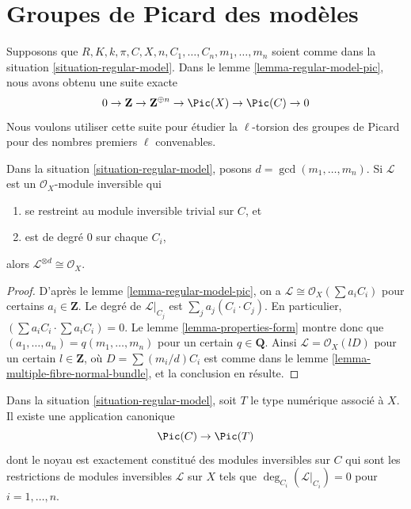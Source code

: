 




\section{Groupes de Picard des modèles}
\label{section-picard-groups-models}

\noindent
Supposons que $R,K,k,\pi,C,X,n,C_1,\ldots,C_n,m_1,\ldots,m_n$ soient comme
dans la situation \ref{situation-regular-model}. Dans le lemme
\ref{lemma-regular-model-pic}, nous avons obtenu une suite exacte
$$
0 \to \mathbf{Z} \to \mathbf{Z}^{\oplus n} \to
\Pic(X) \to \Pic(C) \to 0
$$
Nous voulons utiliser cette suite pour étudier la $\ell$-torsion des
groupes de Picard pour des nombres premiers $\ell$ convenables.

\begin{lemma}
\label{lemma-characterize-trivial}
Dans la situation \ref{situation-regular-model}, posons
$d=\gcd(m_1,\ldots,m_n)$. Si $\mathcal{L}$ est un
$\mathcal{O}_X$-module inversible qui
\begin{enumerate}
\item se restreint au module inversible trivial sur $C$, et
\item est de degré $0$ sur chaque $C_i$,
\end{enumerate}
alors $\mathcal{L}^{\otimes d} \cong \mathcal{O}_X$.
\end{lemma}

\begin{proof}
D'après le lemme \ref{lemma-regular-model-pic}, on a
$\mathcal{L} \cong \mathcal{O}_X(\sum a_iC_i)$ pour certains
$a_i \in \mathbf{Z}$. Le degré de $\mathcal{L}|_{C_j}$ est
$\sum_j a_j(C_i \cdot C_j)$. En particulier,
$(\sum a_iC_i \cdot \sum a_iC_i)=0$. Le lemme
\ref{lemma-properties-form} montre donc que
$(a_1,\ldots,a_n)=q(m_1,\ldots,m_n)$ pour un certain $q\in\mathbf{Q}$.
Ainsi $\mathcal{L}=\mathcal{O}_X(lD)$ pour un certain
$l\in\mathbf{Z}$, où $D=\sum(m_i/d)C_i$ est comme dans le lemme
\ref{lemma-multiple-fibre-normal-bundle}, et la conclusion en résulte.
\end{proof}

\begin{lemma}
\label{lemma-canonical-map-of-pic}
Dans la situation \ref{situation-regular-model}, soit $T$ le type numérique
associé à $X$. Il existe une application canonique
$$
\Pic(C) \to \Pic(T)
$$
dont le noyau est exactement constitué des modules inversibles sur $C$ qui
sont les restrictions de modules inversibles $\mathcal{L}$ sur $X$ tels
que $\deg_{C_i}(\mathcal{L}|_{C_i})=0$ pour $i=1,\ldots,n$.
\end{lemma}


